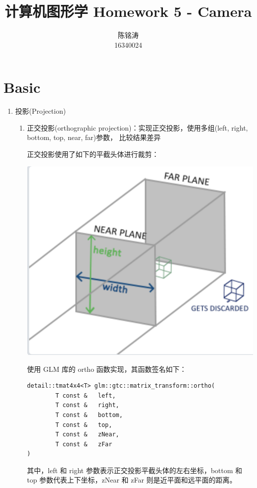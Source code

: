 \documentclass[12pt]{article}
\begin{document}
\author{陈铭涛\\16340024}
\title{计算机图形学 Homework 5 - Camera}
\maketitle

\medskip


\section{Basic}

\begin{enumerate}
    \item 投影(Projection)
    \begin{enumerate}
        \item 正交投影(orthographic projection)：实现正交投影，使用多组(left, right, bottom, top, near, far)参数， 比较结果差异
        
        正交投影使用了如下的平截头体进行裁剪：
        \begin{center}
            \includegraphics[scale=0.5]{ortho_img.png}
        \end{center}
        
        使用 GLM 库的 ortho 函数实现，其函数签名如下：
        \begin{lstlisting}
detail::tmat4x4<T> glm::gtc::matrix_transform::ortho(
        T const &   left,
		T const &  	right,
		T const &  	bottom,
		T const &  	top,
		T const &  	zNear,
		T const &  	zFar 
) 	
        \end{lstlisting}
        其中，left 和 right 参数表示正交投影平截头体的左右坐标，bottom 和 top 参数代表上下坐标，zNear 和 zFar 则是近平面和远平面的距离。


\end{enumerate}
\end{enumerate}
\end{document}
